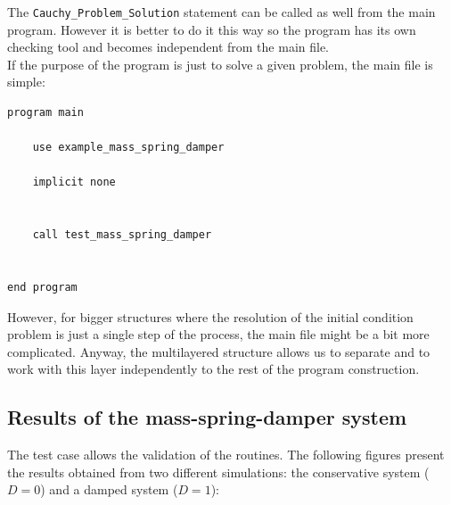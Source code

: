 The \texttt{Cauchy\_Problem\_Solution} statement can be called as
well from the main program. However it is better to do it this way so the
program has its own checking tool and becomes independent from the main file. \\

If the purpose of the program is just to solve a given problem, the main file is
simple: 

\begin {blueframed}
\begin{lstlisting}
program main

    use example_mass_spring_damper

    implicit none


    call test_mass_spring_damper


end program
\end{lstlisting}
\end{blueframed}

However, for bigger structures where the resolution of the initial condition
problem is just a single step of the process, the main file might be a bit more
complicated. Anyway, the multilayered structure allows us to separate and to
work with this layer independently to the rest of the program construction.\\

\newpage

\subsection*{Results of the mass-spring-damper system}

The test case allows the validation of the routines.  The following figures
present the results obtained from two different simulations:  the conservative
system ($D=0$) and a damped system ($D=1$):

